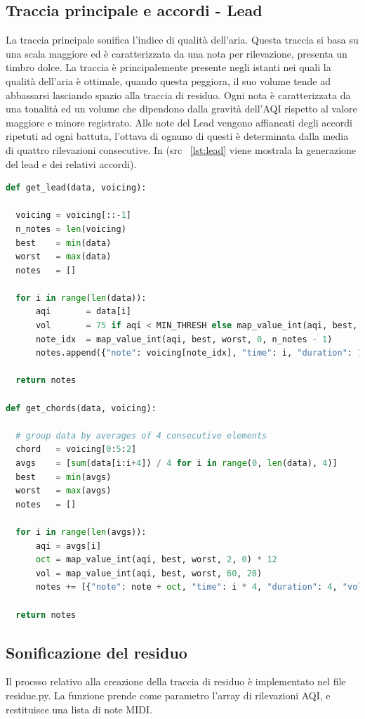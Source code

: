 \subsection{Traccia principale e accordi - Lead}
La traccia principale sonifica l'indice di qualità dell'aria.
Questa traccia si basa su una scala maggiore ed è caratterizzata da una nota per rilevazione, presenta un timbro dolce.
La traccia è principalemente presente negli istanti nei quali la qualità dell'aria è ottimale, quando questa peggiora,
il suo volume tende ad abbassarsi lasciando spazio alla traccia di residuo.
Ogni nota è caratterizzata da una tonalità ed un volume che dipendono dalla gravità dell'AQI rispetto al valore maggiore e minore registrato.
Alle note del Lead vengono affiancati degli accordi ripetuti ad ogni battuta, l'ottava di ognuno di questi è determinata dalla media di quattro rilevazioni consecutive. In (src ~\ref{lst:lead} viene mostrala la generazione del lead e dei relativi accordi).
\newpage
{}
\label{lst:lead}
\begin{lstlisting}[language=Python]
def get_lead(data, voicing):

  voicing = voicing[::-1]
  n_notes = len(voicing)
  best    = min(data)
  worst   = max(data)
  notes   = []

  for i in range(len(data)):
      aqi       = data[i]
      vol       = 75 if aqi < MIN_THRESH else map_value_int(aqi, best, worst, 50, 25)
      note_idx  = map_value_int(aqi, best, worst, 0, n_notes - 1)
      notes.append({"note": voicing[note_idx], "time": i, "duration": 1, "volume": vol })

  return notes

def get_chords(data, voicing):

  # group data by averages of 4 consecutive elements
  chord   = voicing[0:5:2]
  avgs    = [sum(data[i:i+4]) / 4 for i in range(0, len(data), 4)]
  best    = min(avgs)
  worst   = max(avgs)
  notes   = []
  
  for i in range(len(avgs)):
      aqi = avgs[i]
      oct = map_value_int(aqi, best, worst, 2, 0) * 12
      vol = map_value_int(aqi, best, worst, 60, 20)
      notes += [{"note": note + oct, "time": i * 4, "duration": 4, "volume": vol} for note in chord]

  return notes
\end{lstlisting}

\newpage

\subsection{Sonificazione del residuo}
Il procsso relativo alla creazione della traccia di residuo è implementato nel file residue.py.
La funzione prende come parametro l'array di rilevazioni AQI, e restituisce una lista di note MIDI.
